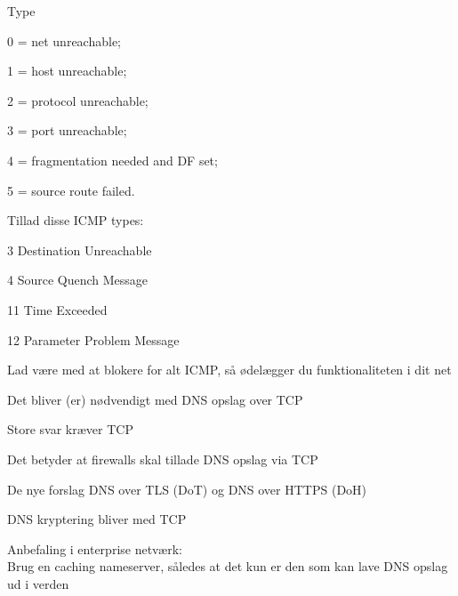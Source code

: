 \documentclass[Screen16to9,17pt]{foils}
\begin{document}

\begin{list1}
\item Type
\begin{list2}
\item 0 = net unreachable;
\item 1 = host unreachable;
\item 2 = protocol unreachable;
\item 3 = port unreachable;
\item 4 = fragmentation needed and DF set;
\item 5 = source route failed.
\end{list2}
\item Tillad disse ICMP types:
\begin{list2}
\item 3 Destination Unreachable
\item 4 Source Quench Message
\item 11 Time Exceeded
\item 12 Parameter Problem Message
\end{list2}
\end{list1}

\begin{list1}
\item Lad være med at blokere for alt ICMP, så ødelægger du funktionaliteten i dit net
\end{list1}



\begin{list1}
\item Det bliver (er) nødvendigt med DNS opslag over TCP
\vskip 1cm
\item Store svar kræver TCP
\item Det betyder at firewalls skal tillade DNS opslag via TCP
\vskip 1cm
\item De nye forslag DNS over TLS (DoT) og DNS over HTTPS (DoH)
\item DNS kryptering bliver med TCP
\vskip 1cm
\item Anbefaling i enterprise netværk:\\
Brug en caching nameserver, således at det kun er den som kan lave DNS opslag ud i verden

\end{list1}


\end{document}
